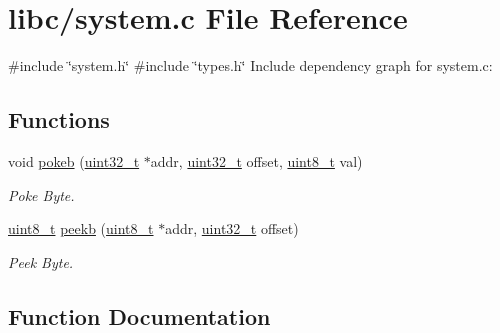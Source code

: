 \hypertarget{a00020}{}\section{libc/system.c File Reference}
\label{a00020}
{\ttfamily \#include \char`\"{}system.\+h\char`\"{}}\newline
{\ttfamily \#include \char`\"{}types.\+h\char`\"{}}\newline
Include dependency graph for system.\+c\+:
\subsection*{Functions}
\begin{DoxyCompactItemize}
\item 
void \hyperlink{a00020_aa291c9926b84df379482632e80ec7c47_aa291c9926b84df379482632e80ec7c47}{pokeb} (\hyperlink{a00026_a435d1572bf3f880d55459d9805097f62_a435d1572bf3f880d55459d9805097f62}{uint32\+\_\+t} $\ast$addr, \hyperlink{a00026_a435d1572bf3f880d55459d9805097f62_a435d1572bf3f880d55459d9805097f62}{uint32\+\_\+t} offset, \hyperlink{a00026_aba7bc1797add20fe3efdf37ced1182c5_aba7bc1797add20fe3efdf37ced1182c5}{uint8\+\_\+t} val)
\begin{DoxyCompactList}\small\item\em Poke Byte. \end{DoxyCompactList}\item 
\hyperlink{a00026_aba7bc1797add20fe3efdf37ced1182c5_aba7bc1797add20fe3efdf37ced1182c5}{uint8\+\_\+t} \hyperlink{a00020_a353956c1fd65c7ed787836534fc9354e_a353956c1fd65c7ed787836534fc9354e}{peekb} (\hyperlink{a00026_aba7bc1797add20fe3efdf37ced1182c5_aba7bc1797add20fe3efdf37ced1182c5}{uint8\+\_\+t} $\ast$addr, \hyperlink{a00026_a435d1572bf3f880d55459d9805097f62_a435d1572bf3f880d55459d9805097f62}{uint32\+\_\+t} offset)
\begin{DoxyCompactList}\small\item\em Peek Byte. \end{DoxyCompactList}\end{DoxyCompactItemize}


\subsection{Function Documentation}
\mbox{\label{a00020_a353956c1fd65c7ed787836534fc9354e_a353956c1fd65c7ed787836534fc9354e}} 
